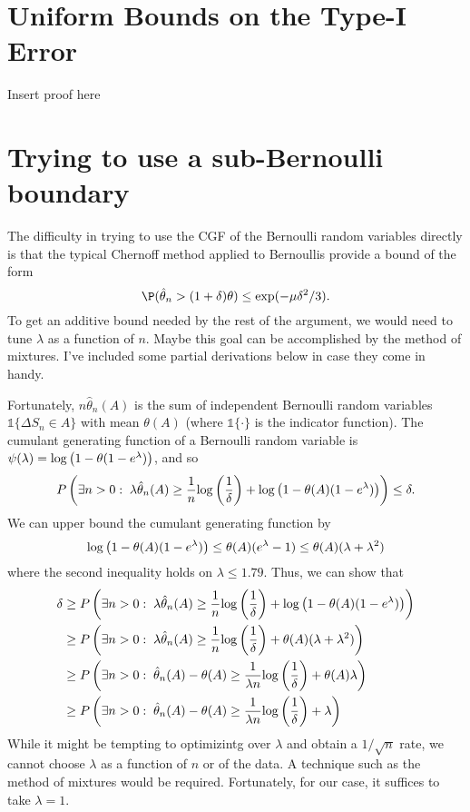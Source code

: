\documentclass[11pt]{article}
\def\log{{\rm log}}
\begin{document}
\section{Uniform Bounds on the Type-I Error}
\label{app:type_1_error}
Insert proof here
\section{Trying to use a sub-Bernoulli boundary}
The difficulty in trying to use the CGF of the Bernoulli random variables directly is that the typical Chernoff method applied to Bernoullis provide a bound of the form
\[
  \P(\hat\theta_n > (1+\delta)\theta)\leq \exp(-\mu\delta^2/3).
\]
To get an additive bound needed by the rest of the argument, we would need to tune $\lambda$ as a function of $n$. Maybe this goal can be accomplished by the method of mixtures. I've included some partial derivations below in case they come in handy.

Fortunately, $n \hat\theta_n(A)$ is the sum of independent Bernoulli random variables $\mathds{1}\{ \Delta S_n \in A\}$ with mean $\theta(A)$ (where $\mathds{1}\{\cdot\}$ is the indicator function). The cumulant generating function of a Bernoulli random variable is $\psi(\lambda) = \log\left(1 - \theta(1-e^\lambda)\right)$, and so
\[
  P\left(
    \exists n > 0:\;
    \lambda \hat\theta_n(A)
    \geq
    \frac{1}{n}\log\left(\frac{1}{\delta}\right)
    + \log\left(1 - \theta(A)(1-e^\lambda)\right)
  \right)
  \leq \delta.
\]
We can upper bound the cumulant generating function by
\[
  \log\left(1 - \theta(A)(1-e^\lambda)\right)
  \leq
  \theta(A)(e^\lambda-1)
  \leq
  \theta(A)(\lambda+\lambda^2)
\]
where the second inequality holds  on $\lambda \leq 1.79$. Thus, we can show that 
\begin{align*}
  \delta
  &\geq 
    P\left(
    \exists n > 0:\;
    \lambda \hat\theta_n(A)
    \geq
    \frac{1}{n}\log\left(\frac{1}{\delta}\right)
    + \log\left(1 - \theta(A)(1-e^\lambda)\right)
    \right)\\
  &\geq
    P\left(
    \exists n > 0:\;
    \lambda \hat\theta_n(A)
    \geq
    \frac{1}{n}\log\left(\frac{1}{\delta}\right)
    +  \theta(A)(\lambda + \lambda^2)
    \right)\\
  &\geq
    P\left(
    \exists n > 0:\;
    \hat\theta_n(A) - \theta(A)
    \geq
    \frac{1}{\lambda n}\log\left(\frac{1}{\delta}\right)
    +  \theta(A)\lambda
    \right)\\
    &\geq
    P\left(
    \exists n > 0:\;
    \hat\theta_n(A) - \theta(A)
    \geq
    \frac{1}{\lambda n}\log\left(\frac{1}{\delta}\right)
    +  \lambda
    \right)    
\end{align*}
While it might be tempting to optimizintg over $\lambda$ and obtain a $1/\sqrt{n}$ rate, we cannot choose $\lambda$ as a function of $n$ or of the data. A technique such as the method of mixtures \citep{delapena2000moment} would be required. Fortunately, for our case, it suffices to take $\lambda = 1$.
\end{document}
